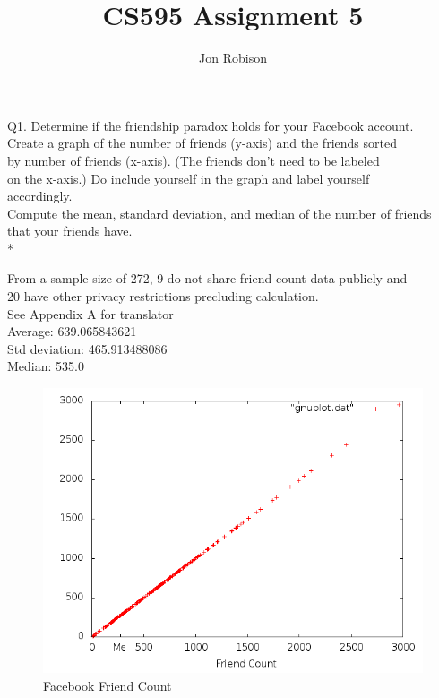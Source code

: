 \documentclass{article}
\begin{document}
\author{Jon Robison}
\title{CS595 Assignment 5}
\maketitle

Q1.  Determine if the friendship paradox holds for your Facebook account.\\
Create a graph of the number of friends (y-axis) and the friends sorted\\
by number of friends (x-axis).  (The friends don't need to be labeled \\
on the x-axis.)  Do include yourself in the graph and label yourself\\
accordingly.\\
Compute the mean, standard deviation, and median of the number of friends\\
that your friends have. \\*

From a sample size of 272, 9 do not share friend count data publicly and\\
20 have other privacy restrictions precluding calculation.\\
See Appendix A for translator\\
Average: 639.065843621 \\
Std deviation: 465.913488086 \\
Median: 535.0 \\
\graphicspath{{q1/}}
\begin{figure}[H]
  \centering
  \caption{Facebook Friend Count}
  \includegraphics[scale=.42]{scatter.png}
\end{figure}
\clearpage
\end{document}
